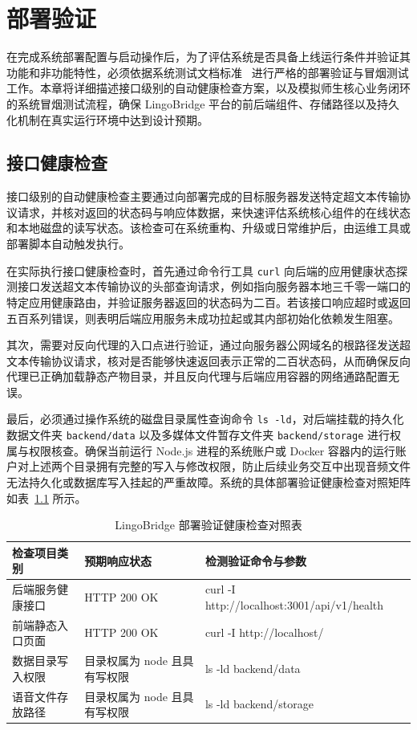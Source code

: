 \chapter{部署验证}

在完成系统部署配置与启动操作后，为了评估系统是否具备上线运行条件并验证其功能和非功能特性，必须依据系统测试文档标准~\cite{ieee829} 进行严格的部署验证与冒烟测试工作。本章将详细描述接口级别的自动健康检查方案，以及模拟师生核心业务闭环的系统冒烟测试流程，确保 LingoBridge 平台的前后端组件、存储路径以及持久化机制在真实运行环境中达到设计预期。

\section{接口健康检查}

接口级别的自动健康检查主要通过向部署完成的目标服务器发送特定超文本传输协议请求，并核对返回的状态码与响应体数据，来快速评估系统核心组件的在线状态和本地磁盘的读写状态。该检查可在系统重构、升级或日常维护后，由运维工具或部署脚本自动触发执行。

在实际执行接口健康检查时，首先通过命令行工具 \texttt{curl} 向后端的应用健康状态探测接口发送超文本传输协议的头部查询请求，例如指向服务器本地三千零一端口的特定应用健康路由，并验证服务器返回的状态码为二百。若该接口响应超时或返回五百系列错误，则表明后端应用服务未成功拉起或其内部初始化依赖发生阻塞。

其次，需要对反向代理的入口点进行验证，通过向服务器公网域名的根路径发送超文本传输协议请求，核对是否能够快速返回表示正常的二百状态码，从而确保反向代理已正确加载静态产物目录，并且反向代理与后端应用容器的网络通路配置无误。

最后，必须通过操作系统的磁盘目录属性查询命令 \texttt{ls -ld}，对后端挂载的持久化数据文件夹 \texttt{backend/data} 以及多媒体文件暂存文件夹 \texttt{backend/storage} 进行权属与权限核查。确保当前运行 Node.js 进程的系统账户或 Docker 容器内的运行账户对上述两个目录拥有完整的写入与修改权限，防止后续业务交互中出现音频文件无法持久化或数据库写入挂起的严重故障。系统的具体部署验证健康检查对照矩阵如表~\ref{tab:healthcheck-matrix} 所示。

\begin{table}[htbp]
  \centering
  \caption{LingoBridge 部署验证健康检查对照表}
  \label{tab:healthcheck-matrix}
  \begin{tabularx}{\textwidth}{llX}
    \toprule
    检查项目类别 & 预期响应状态 & 检测验证命令与参数 \\
    \midrule
    后端服务健康接口 & HTTP 200 OK & curl -I http://localhost:3001/api/v1/health \allowbreak \\
    前端静态入口页面 & HTTP 200 OK & curl -I http://localhost/ \allowbreak \\
    数据目录写入权限 & 目录权属为 node 且具有写权限 & ls -ld backend/data \allowbreak \\
    语音文件存放路径 & 目录权属为 node 且具有写权限 & ls -ld backend/storage \allowbreak \\
    \bottomrule
  \end{tabularx}
\end{table}

